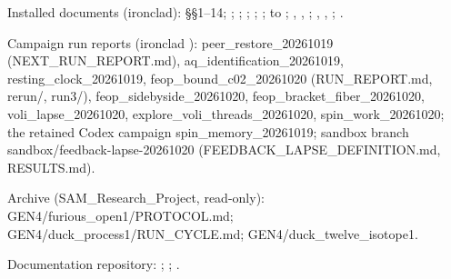 Installed documents (ironclad):  §§1--14; ; ; ;
; ;  to ; ,
, ; , , ; .

Campaign run reports (ironclad ): peer\_restore\_20261019 (NEXT\_RUN\_REPORT.md), aq\_identification\_20261019, resting\_clock\_20261019,
feop\_bound\_c02\_20261020 (RUN\_REPORT.md, rerun/, run3/), feop\_sidebyside\_20261020, feop\_bracket\_fiber\_20261020, voli\_lapse\_20261020,
explore\_voli\_threads\_20261020, spin\_work\_20261020; the retained Codex campaign spin\_memory\_20261019; sandbox branch
sandbox/feedback-lapse-20261020 (FEEDBACK\_LAPSE\_DEFINITION.md, RESULTS.md).

Archive (SAM\_Research\_Project, read-only): GEN4/furious\_open1/PROTOCOL.md; GEN4/duck\_process1/RUN\_CYCLE.md; GEN4/duck\_twelve\_isotope1.

Documentation repository: ; ; .
